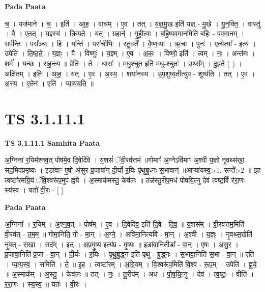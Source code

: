 \documentclass[17pt]{extarticle}
\begin{document}
\textbf{Pada Paata} \newline

च॒ । यज॑माने । च॒ । इति॑ । आ॒ह॒ । वाच᳚म् । ए॒व । तत् । य॒ज्ञ्॒मु॒ख इति॑ यज्ञ् - मु॒खे । यु॒न॒क्ति॒ । वास्तु॑ । वै । ए॒तत् । य॒ज्ञ्स्य॑ । क्रि॒य॒ते॒ । यत् । ग्रहान्॑ । गृ॒ही॒त्वा । ब॒हि॒ष्प॒व॒मा॒नमिति॑ बहिः - प॒व॒मा॒नम् । सर्प॑न्ति । परा᳚ञ्चः । हि । यन्ति॑ । परा॑चीभिः । स्तु॒वते᳚ । वै॒ष्ण॒व्या । ऋ॒चा । पुनः॑ । एत्येत्या᳚ - इत्य॑ । उपेति॑ । ति॒ष्ठ॒ते॒ । य॒ज्ञ्ः । वै । विष्णुः॑ । य॒ज्ञ्म् । ए॒व । अ॒कः॒ । विष्णो॒ इति॑ । त्वम् । नः॒ । अन्त॑मः । शर्म॑ । य॒च्छ॒ । स॒ह॒न्त्य॒ ॥ प्रेति॑ । ते॒ । धाराः᳚ । म॒धु॒श्चुत॒ इति॑ मधु-श्चुतः॑ । उथ्स᳚म् । दु॒ह्र॒ते॒ ( ) । अक्षि॑तम् । इति॑ । आ॒ह॒ । यत् । ए॒व । अ॒स्य॒ । शया॑नस्य । उ॒प॒शुष्य॒तीत्यु॑प - शुष्य॑ति । तत् । ए॒व । अ॒स्य॒ । ए॒तेन॑ । एति॑ । प्या॒य॒य॒ति॒ ॥  \newline




\section*{ TS 3.1.11.1 }

\textbf{TS 3.1.11.1 } \newline
\textbf{Samhita Paata} \newline

अ॒ग्निना॑ र॒यिम॑श्नव॒त् पोष॑मे॒व दि॒वेदि॑वे । य॒शसं॑ ॅवी॒रव॑त्तमं ॥गोमाꣳ॑ अ॒ग्नेऽवि॑माꣳ अ॒श्वी य॒ज्ञो नृ॒वथ्स॑खा॒ सद॒मिद॑प्रमृ॒ष्यः । इडा॑वाꣳ ए॒षो अ॑सुर प्र॒जावा᳚न् दी॒र्घो र॒यिः पृ॑थुबु॒ध्नः स॒भावान्॑ ॥आप्या॑यस्व॒>1, सन्ते᳚>2 ॥ इ॒ह त्वष्टा॑रमग्रि॒यं ॅवि॒श्वरू॑प॒मुप॑ ह्वये । अ॒स्माक॑मस्तु॒ केव॑लः ॥ तन्न॑स्तु॒रीप॒मध॑ पोषयि॒त्नु देव॑ त्वष्ट॒र्वि र॑रा॒णः स्य॑स्व । यतो॑ वी॒रः - [  ] \newline

\textbf{Pada Paata} \newline

अ॒ग्निना᳚ । र॒यिम् । अ॒श्न॒व॒त् । पोष᳚म् । ए॒व । दि॒वेदि॑व॒ इति॑ दि॒वे - दि॒व॒ ॥ य॒शस᳚म् । वी॒रव॑त्तम॒मिति॑ वी॒रव॑त् - त॒म॒म् ॥ गोमा॒निति॒ गो - मा॒न् । अ॒ग्ने॒ । अवि॑मा॒नित्यवि॑ - मा॒न् । अ॒श्वी । य॒ज्ञ्ः । नृ॒वथ्स॒खेति॑ नृ॒वत् - स॒खा॒ । सद᳚म् । इत् । अ॒प्र॒मृ॒ष्य इत्य॑प्र - मृ॒ष्यः ॥ इडा॑वा॒नितीडा᳚ - वा॒न् । ए॒षः । अ॒सु॒र॒ । प्र॒जावा॒निति॑ प्र॒जा - वा॒न् । दी॒र्घः । र॒यिः । पृ॒थु॒बु॒द्ध्न इति॑ पृथु - बु॒द्ध्नः । स॒भावा॒निति॑ स॒भा - वा॒न् ॥ एति॑ । प्या॒य॒स्व॒ । समिति॑ । ते॒ ॥ इ॒ह । त्वष्टा॑रम् । अ॒ग्रि॒यम् । वि॒श्वरू॑प॒मिति॑ वि॒श्व - रू॒प॒म् । उपेति॑ । ह्व॒ये॒ ॥ अ॒स्माक᳚म् । अ॒स्तु॒ । केव॑लः ॥ तत् । नः॒ । तु॒रीप᳚म् । अध॑ । पो॒ष॒यि॒त्नु । देव॑ । त्व॒ष्टः॒ । वीति॑ । र॒रा॒णः । स्य॒स्व॒ ॥ यतः॑ । वी॒रः ।  \newline
\end{document}
